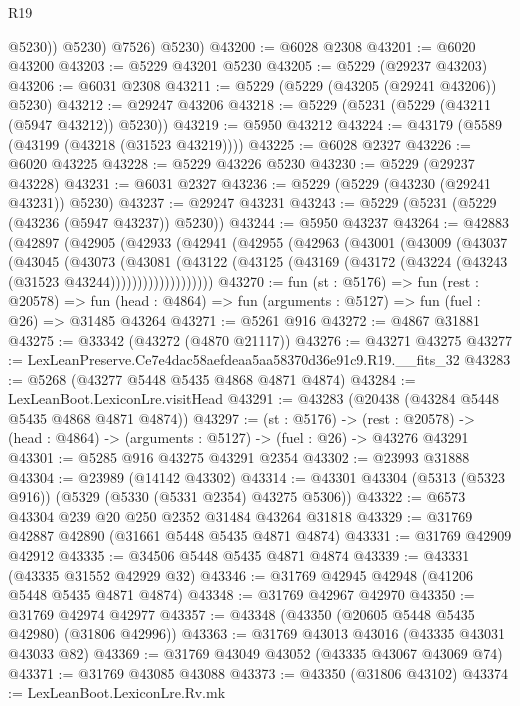\begin{lexlean}{R19}
\begin{coremodule}
              @5230))
          @5230)
        @7526)
      @5230)
@43200 := @6028 @2308
@43201 := @6020 @43200
@43203 := @5229 @43201 @5230
@43205 := @5229 (@29237 @43203)
@43206 := @6031 @2308
@43211 := @5229 (@5229 (@43205 (@29241 @43206)) @5230)
@43212 := @29247 @43206
@43218 := @5229 (@5231 (@5229 (@43211 (@5947 @43212)) @5230))
@43219 := @5950 @43212
@43224 := @43179 (@5589 (@43199 (@43218 (@31523 @43219))))
@43225 := @6028 @2327
@43226 := @6020 @43225
@43228 := @5229 @43226 @5230
@43230 := @5229 (@29237 @43228)
@43231 := @6031 @2327
@43236 := @5229 (@5229 (@43230 (@29241 @43231)) @5230)
@43237 := @29247 @43231
@43243 := @5229 (@5231 (@5229 (@43236 (@5947 @43237)) @5230))
@43244 := @5950 @43237
@43264 := @42883
    (@42897
      (@42905
        (@42933
          (@42941
            (@42955
              (@42963
                (@43001
                  (@43009
                    (@43037
                      (@43045
                        (@43073
                          (@43081
                            (@43122
                              (@43125
                                (@43169 (@43172 (@43224 (@43243 (@31523 @43244)))))))))))))))))))
@43270 := fun (st : @5176) =>
  fun (rest : @20578) =>
  fun (head : @4864) => fun (arguments : @5127) => fun (fuel : @26) => @31485 @43264
@43271 := @5261 @916
@43272 := @4867 @31881
@43275 := @33342 (@43272 (@4870 @21117))
@43276 := @43271 @43275
@43277 := LexLeanPreserve.Ce7e4dac58aefdeaa5aa58370d36e91c9.R19.__fits_32
@43283 := @5268 (@43277 @5448 @5435 @4868 @4871 @4874)
@43284 := LexLeanBoot.LexiconLre.visitHead
@43291 := @43283 (@20438 (@43284 @5448 @5435 @4868 @4871 @4874))
@43297 := (st : @5176) ->
  (rest : @20578) -> (head : @4864) -> (arguments : @5127) -> (fuel : @26) -> @43276 @43291
@43301 := @5285 @916 @43275 @43291 @2354
@43302 := @23993 @31888
@43304 := @23989 (@14142 @43302)
@43314 := @43301 @43304 (@5313 (@5323 @916)) (@5329 (@5330 (@5331 @2354) @43275 @5306))
@43322 := @6573 @43304 @239 @20 @250 @2352 @31484 @43264 @31818
@43329 := @31769 @42887 @42890 (@31661 @5448 @5435 @4871 @4874)
@43331 := @31769 @42909 @42912
@43335 := @34506 @5448 @5435 @4871 @4874
@43339 := @43331 (@43335 @31552 @42929 @32)
@43346 := @31769 @42945 @42948 (@41206 @5448 @5435 @4871 @4874)
@43348 := @31769 @42967 @42970
@43350 := @31769 @42974 @42977
@43357 := @43348 (@43350 (@20605 @5448 @5435 @42980) (@31806 @42996))
@43363 := @31769 @43013 @43016 (@43335 @43031 @43033 @82)
@43369 := @31769 @43049 @43052 (@43335 @43067 @43069 @74)
@43371 := @31769 @43085 @43088
@43373 := @43350 (@31806 @43102)
@43374 := LexLeanBoot.LexiconLre.Rv.mk

\end{coremodule}
\end{lexlean}
